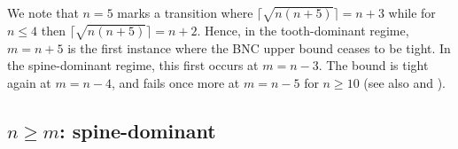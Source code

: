 \documentclass{article}
\begin{document}
We note that $n = 5$ marks a transition where $\lceil \sqrt{n(n+5)}\rceil = n + 3$ while for $n \le 4$ then $\lceil \sqrt{n(n+5)}\rceil = n + 2$. Hence, in the tooth-dominant regime, $m = n + 5$ is the first instance where the BNC upper bound ceases to be tight. In the spine-dominant regime, this first occurs at $m = n-3$. The bound is tight again at $m = n-4$, and fails once more at $m = n-5$ for $n \ge 10$ (see also  and ).





\subsection{\texorpdfstring{\boldmath$n \ge m$}{n ge m}: spine-dominant}
\label{sec: spine dom}
\end{document}
